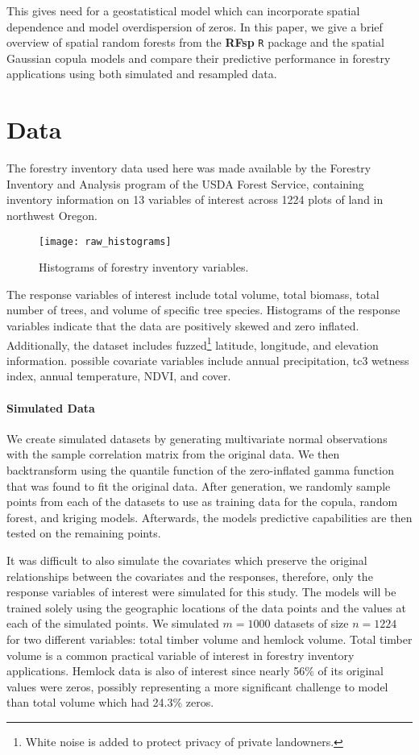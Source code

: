 \documentclass{article}
\begin{document}
This gives need for a geostatistical model which can incorporate spatial dependence and model overdispersion of zeros.
In this paper, we give a brief overview of spatial random forests from the \textbf{RFsp} \texttt{R} package\cite{hengl18} and the spatial Gaussian copula models\cite{madsen09} and compare their predictive performance in forestry applications using both simulated and resampled data.

\section{Data}

The forestry inventory data used here was made available by the Forestry Inventory and Analysis program of the USDA Forest Service, containing inventory information on 13 variables of interest across 1224 plots of land in northwest Oregon.

\begin{wrapfigure}{r}{.49\textwidth}
	\texttt{[image: raw\_histograms]}
	\caption{Histograms of forestry inventory variables.}
\end{wrapfigure}

The response variables of interest include total volume, total biomass, total number of trees, and volume of specific tree species.
Histograms of the response variables indicate that the data are positively skewed and zero inflated.
Additionally, the dataset includes fuzzed\footnote{White noise is added to protect privacy of private landowners.} latitude, longitude, and elevation information.
possible covariate variables include annual precipitation, tc3 wetness index\cite{raynolds16}, annual temperature, NDVI, and cover.

\paragraph{Simulated Data} We create simulated datasets by generating multivariate normal observations with the sample correlation matrix from the original data.
We then backtransform using the quantile function of the zero-inflated gamma function that was found to fit the original data.
After generation, we randomly sample points from each of the datasets to use as training data for the copula, random forest, and kriging models.
Afterwards, the models predictive capabilities are then tested on the remaining points.

It was difficult to also simulate the covariates which preserve the original relationships between the covariates and the responses, therefore, only the response variables of interest were simulated for this study.
The models will be trained solely using the geographic locations of the data points and the values at each of the simulated points.
We simulated $m = 1000$ datasets of size $n = 1224$ for two different variables: total timber volume and hemlock volume.
Total timber volume is a common practical variable of interest in forestry inventory applications.
Hemlock data is also of interest since nearly 56\% of its original values were zeros, possibly representing a more significant challenge to model than total volume which had 24.3\% zeros.
\end{document}
